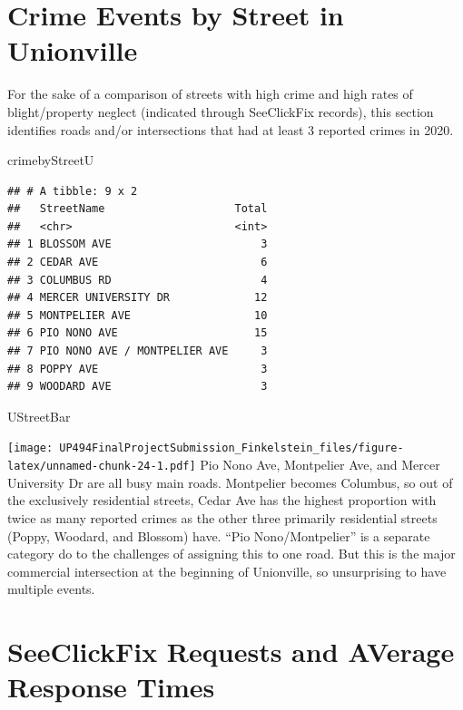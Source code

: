 \documentclass[
]{article}
\newenvironment{Shaded}{\begin{snugshade}}{\end{snugshade}}
\newcommand{\NormalTok}[1]{#1}
\begin{document}
\hypertarget{crime-events-by-street-in-unionville}{%
\section{Crime Events by Street in
Unionville}\label{crime-events-by-street-in-unionville}}

For the sake of a comparison of streets with high crime and high rates
of blight/property neglect (indicated through SeeClickFix records), this
section identifies roads and/or intersections that had at least 3
reported crimes in 2020.

\begin{Shaded}
\begin{Highlighting}[]
\NormalTok{crimebyStreetU}
\end{Highlighting}
\end{Shaded}

\begin{verbatim}
## # A tibble: 9 x 2
##   StreetName                    Total
##   <chr>                         <int>
## 1 BLOSSOM AVE                       3
## 2 CEDAR AVE                         6
## 3 COLUMBUS RD                       4
## 4 MERCER UNIVERSITY DR             12
## 5 MONTPELIER AVE                   10
## 6 PIO NONO AVE                     15
## 7 PIO NONO AVE / MONTPELIER AVE     3
## 8 POPPY AVE                         3
## 9 WOODARD AVE                       3
\end{verbatim}

\begin{Shaded}
\begin{Highlighting}[]
\NormalTok{UStreetBar}
\end{Highlighting}
\end{Shaded}

\texttt{[image: UP494FinalProjectSubmission\_Finkelstein\_files/figure-latex/unnamed-chunk-24-1.pdf]}
Pio Nono Ave, Montpelier Ave, and Mercer University Dr are all busy main
roads. Montpelier becomes Columbus, so out of the exclusively
residential streets, Cedar Ave has the highest proportion with twice as
many reported crimes as the other three primarily residential streets
(Poppy, Woodard, and Blossom) have. ``Pio Nono/Montpelier'' is a
separate category do to the challenges of assigning this to one road.
But this is the major commercial intersection at the beginning of
Unionville, so unsurprising to have multiple events.

\hypertarget{seeclickfix-requests-and-average-response-times}{%
\section{SeeClickFix Requests and AVerage Response
Times}\label{seeclickfix-requests-and-average-response-times}}
\end{document}
